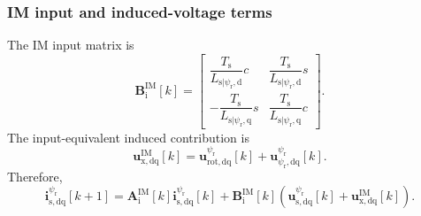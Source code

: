 \begin{frame}
	\frametitle{IM input and induced-voltage terms}
	The IM input matrix is
	\begin{equation*}
		\bm{B}_{\mathrm{i}}^{\mathrm{IM}}[k]=
		\begin{bmatrix}
			\dfrac{T_{\mathrm{s}}}{L_{\mathrm{s}|\psi_{\mathrm{r}},\mathrm{d}}}c  &
			\dfrac{T_{\mathrm{s}}}{L_{\mathrm{s}|\psi_{\mathrm{r}},\mathrm{d}}}s    \\[4mm]
			-\dfrac{T_{\mathrm{s}}}{L_{\mathrm{s}|\psi_{\mathrm{r}},\mathrm{q}}}s &
			\dfrac{T_{\mathrm{s}}}{L_{\mathrm{s}|\psi_{\mathrm{r}},\mathrm{q}}}c
		\end{bmatrix}.
	\end{equation*}\pause%
	The input-equivalent induced contribution is
	\begin{equation*}
		\boxed{\bm{u}_{\mathrm{x},\mathrm{dq}}^{\mathrm{IM}}[k]
			=\bm{u}_{\mathrm{rot},\mathrm{dq}}^{\psi_{\mathrm{r}}}[k]
			+\bm{u}_{\psi_{\mathrm{r}},\mathrm{dq}}^{\psi_{\mathrm{r}}}[k].}
	\end{equation*}\pause%
	Therefore,
	\begin{equation*}
		\bm{i}_{\mathrm{s},\mathrm{dq}}^{\psi_{\mathrm{r}}}[k+1]
		=\bm{A}_{\mathrm{i}}^{\mathrm{IM}}[k]\bm{i}_{\mathrm{s},\mathrm{dq}}^{\psi_{\mathrm{r}}}[k]
		+\bm{B}_{\mathrm{i}}^{\mathrm{IM}}[k]
		\left(\bm{u}_{\mathrm{s},\mathrm{dq}}^{\psi_{\mathrm{r}}}[k]
		+\bm{u}_{\mathrm{x},\mathrm{dq}}^{\mathrm{IM}}[k]\right).
	\end{equation*}
\end{frame}

